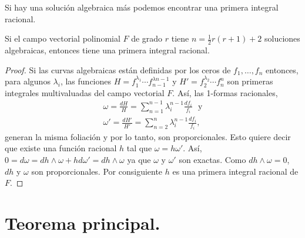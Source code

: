 Si hay una solución algebraica más podemos encontrar una primera integral racional.

\begin{Teorema}
\label{Teo:Darboux}
Si el campo vectorial polinomial $F$ de grado $r$ tiene $n=\frac{1}{2}r(r+1)+2$ soluciones algebraicas, entonces tiene una primera integral racional.
\end{Teorema}
\begin{proof}
Si las curvas algebraicas están definidas por los ceros de $f_{1},\ldots,f_{n}$ entonces, para algunos $\lambda_{i}$, las funciones $H=f_{1}^{\lambda_{1}}\cdots f_{n-1}^{\lambda{n-1}}$ y $H'=f_{2}^{\lambda_{2}}\cdots f_{n}^{n}$ son primeras integrales multivaluadas del campo vectorial $F$. Así, las 1-formas racionales,
\begin{align*}
\omega=\frac{dH}{H}=\sum_{n=1}^{n-1}\lambda_{i}^{n-1}\frac{df_{i}}{f_{i}}\,\,\,\, \mathrm{y}\\
\omega'=\frac{dH'}{H'}=\sum_{n=2}^{n}\lambda_{i}^{n-1}\frac{df_{i}}{f_{i}},
\end{align*}
\noindent generan la misma foliación y por lo tanto, son proporcionales. Esto quiere decir que existe una función racional $h$ tal que $\omega =h\omega'$. Así, $0=d\omega=dh\wedge \omega + hd\omega' =dh\wedge\omega$ ya que $\omega$ y $\omega'$ son exactas. Como $dh\wedge\omega =0$, $dh$ y $\omega$ son proporcionales. Por consiguiente $h$ es una primera integral racional de $F$.
\end{proof}

\section{Teorema principal.}

